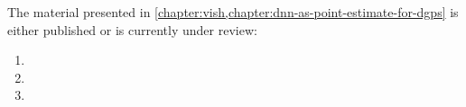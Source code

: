 The material presented in \cref{chapter:vish,chapter:dnn-as-point-estimate-for-dgps} is either published or is currently under review:
\begin{enumerate}
    \item {}
    \item {}
    \item {}
\end{enumerate}





